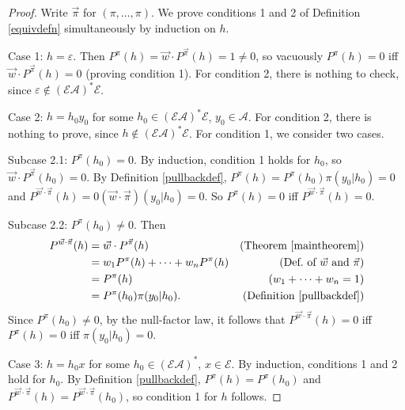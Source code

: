 \documentclass[twoside]{article}
\begin{document}
\begin{proof}
    Write $\vec\pi$ for $(\pi,\ldots,\pi)$.
    We prove conditions 1 and 2 of Definition \ref{equivdefn}
    simultaneously by induction on $h$.
 
    Case 1: $h=\varepsilon$. Then
    $P^\pi(h)=\vec w\cdot{P^{\vec\pi}}(h)=1\not=0$, so
    vacuously $P^\pi(h)=0$ iff $\vec w\cdot{P^{\vec\pi}}(h)=0$
    (proving condition 1).
    For condition 2, there is nothing to check, since
    $\varepsilon\not\in(\mathcal E\mathcal A)^*\mathcal E$.

    Case 2: $h=h_0y_0$ for some
        $h_0\in(\mathcal E\mathcal A)^*\mathcal E$, $y_0\in\mathcal A$.
        For condition 2, there is nothing to prove, since
        $h\not\in(\mathcal E\mathcal A)^*\mathcal E$.
        For condition 1, we consider two cases.

        Subcase 2.1: $P^\pi(h_0)=0$.
        By induction, condition 1 holds for $h_0$, so
        $\vec w\cdot{P^{\vec\pi}}(h_0)=0$.
        By Definition \ref{pullbackdef},
        $P^\pi(h)=P^\pi(h_0)\pi(y_0|h_0)=0$
        and $P^{\vec w\cdot\vec\pi}(h)=0(\vec w\cdot\vec\pi)(y_0|h_0)=0$.
        So $P^\pi(h)=0$ iff $P^{\vec w\cdot\vec\pi}(h)=0$.

        Subcase 2.2: $P^\pi(h_0)\not=0$.
        Then
        \begin{align*}
            P^{\vec w\cdot \vec\pi}(h)
                &= \vec w\cdot{P^{\vec\pi}}(h)
                    &\mbox{(Theorem \ref{maintheorem})}\\
                &= w_1 P^\pi(h)+\cdots+w_n P^\pi(h)
                    &\mbox{(Def.\ of $\vec w$ and $\vec\pi$)}\\
                &= P^\pi(h)
                    &\mbox{($w_1+\cdots+w_n=1$)}\\
                &= P^\pi(h_0)\pi(y_0|h_0).
                    &\mbox{(Definition \ref{pullbackdef})}
        \end{align*}
        Since $P^\pi(h_0)\not=0$,
        by the null-factor law,
        it follows that
        $P^{\vec w\cdot\vec\pi}(h)=0$ iff $P^\pi(h)=0$ iff $\pi(y_0|h_0)=0$.

    Case 3: $h=h_0x$ for some $h_0\in (\mathcal E\mathcal A)^*$,
        $x\in\mathcal E$.
        By induction, conditions 1 and 2 hold for $h_0$.
        By Definition \ref{pullbackdef},
        $P^\pi(h)=P^\pi(h_0)$ and
        $P^{\vec w\cdot\vec\pi}(h)=P^{\vec w\cdot\vec\pi}(h_0)$,
        so condition 1 for $h$ follows.


\end{proof}
\end{document}
